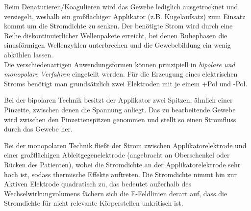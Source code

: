 \documentclass[letterpaper,12pt]{article}
\begin{document}
		Beim Denaturieren/Koagulieren wird das Gewebe lediglich ausgetrocknet und versiegelt, weshalb ein  großflächiger Applikator (z.B. Kugelaufsatz) zum Einsatz kommt um die Stromdichte zu senken. Der benötigte Strom wird durch eine Reihe diskontinuierlicher Wellenpakete erreicht, bei denen Ruhephasen die sinusförmigen Wellenzyklen unterbrechen und die Gewebebildung ein wenig abkühlen lassen.\\
		
		Die verschiedenartigen Anwendungsformen können prinzipiell in \emph{bipolare und monopolare Verfahren} eingeteilt werden. Für die Erzeugung eines elektrischen Stroms benötigt man grundsätzlich zwei Elektroden mit je einem +Pol und -Pol. 
		
		Bei der bipolaren Technik besitzt der Applikator zwei Spitzen, ähnlich einer Pinzette, zwischen denen die Spannung anliegt. Das zu bearbeitende Gewebe wird zwischen den Pinzettenspitzen genommen und stellt so einen Stromfluss durch das Gewebe her. 
		
		Bei der monopolaren Technik fließt der Strom zwischen Applikatorelektrode und einer großflächigen Ableitgegenelektrode (angebracht an Oberschenkel oder Rücken des Patienten), wobei die Stromdichte an der Applikatorelektrode sehr hoch ist, sodass thermische Effekte auftreten.
		Die Stromdichte nimmt hin zur Aktiven Elektrode quadratisch zu, das bedeutet außerhalb des Wechselwirkungvolumens fächern sich die E-Feldlinien derart auf, dass die Stromdichte für nicht relevante Körperstellen unkritisch ist.
		
	
\end{document}
